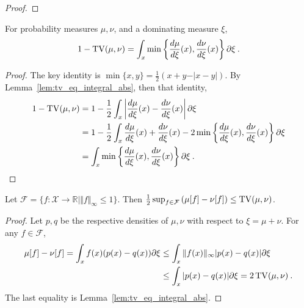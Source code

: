 \begin{proof}%
\end{proof}

\begin{lemma}
  \label{lem:one_sub_tv_eq_integral_min}
  For probability measures $\mu, \nu$, and a dominating measure $\xi$,
  \begin{align*}
  1 - \operatorname{TV}(\mu, \nu)
  = \int_x \min\left\{ \frac{d\mu}{d\xi}(x), \frac{d\nu}{d\xi}(x)\right\}\partial \xi
  \: .
  \end{align*}
\end{lemma}

\begin{proof}%
{}
The key identity is $\min\{x, y\} = \frac{1}{2}\left(x + y - \vert x - y \vert\right)$.
By Lemma~\ref{lem:tv_eq_integral_abs}, then that identity,
\begin{align*}
1 - \operatorname{TV}(\mu, \nu)
&= 1 - \frac{1}{2}\int_x \left\vert \frac{d\mu}{d\xi}(x) - \frac{d\nu}{d\xi}(x)\right\vert \partial \xi
\\
&= 1 - \frac{1}{2}\int_x \frac{d\mu}{d\xi}(x) + \frac{d\nu}{d\xi}(x) - 2\min\left\{ \frac{d\mu}{d\xi}(x), \frac{d\nu}{d\xi}(x)\right\} \partial \xi
\\
&= \int_x \min\left\{ \frac{d\mu}{d\xi}(x), \frac{d\nu}{d\xi}(x)\right\}\partial \xi
\: .
\end{align*}
\end{proof}

\begin{lemma}
  \label{lem:tv_eq_sup_aux}
  Let $\mathcal F = \{f : \mathcal X \to \mathbb{R} \mid \Vert f \Vert_\infty \le 1\}$.
  Then $\frac{1}{2} \sup_{f \in \mathcal F} \left( \mu[f] - \nu[f] \right) \le \operatorname{TV}(\mu, \nu)$.
\end{lemma}

\begin{proof}
Let $p,q$ be the respective densities of $\mu, \nu$ with respect to $\xi=\mu+\nu$.
For any $f \in \mathcal F$,
\begin{align*}
\mu[f] - \nu[f]
= \int_x f(x)(p(x) - q(x)) \partial\xi
&\le \int_x \Vert f(x) \Vert_\infty \vert p(x) - q(x) \vert \partial\xi
\\
&\le \int_x \vert p(x) - q(x) \vert \partial\xi
= 2 \operatorname{TV}(\mu, \nu)
\: .
\end{align*}
The last equality is Lemma~\ref{lem:tv_eq_integral_abs}.
\end{proof}

